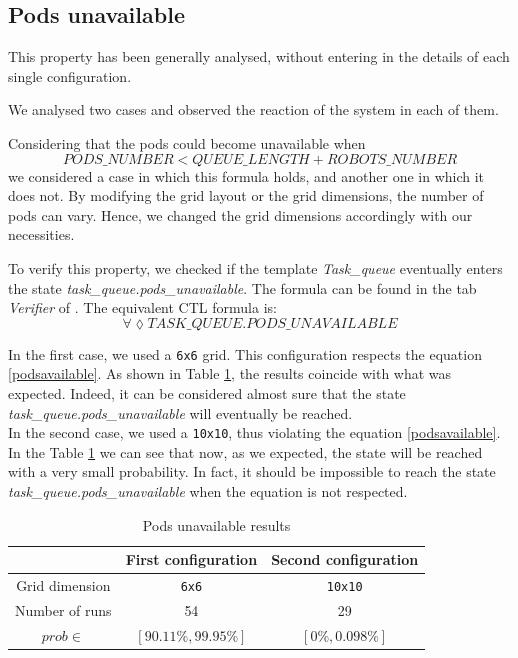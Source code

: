 \subsection{Pods unavailable} \label{podsunavailable}
This property has been generally analysed, without entering in the details of each single configuration.

We analysed two cases and observed the reaction of the system in each of them.

Considering that the pods could become unavailable when 
\begin{equation} \label{podsavailable}
    PODS\_NUMBER < QUEUE\_LENGTH + ROBOTS\_NUMBER
\end{equation}
we considered a case in which this formula holds, and another one in which it does not. By modifying the grid layout or the grid dimensions, the number of pods can vary. Hence, we changed the grid dimensions accordingly with our necessities.

To verify this property, we checked if the template \emph{Task\_queue} eventually enters the state \emph{task\_queue.pods\_unavailable}. The formula can be found in the tab \emph{Verifier} of \UPPAAL. The equivalent CTL formula is:
\begin{equation}
    \forall \lozenge TASK\_QUEUE.PODS\_UNAVAILABLE
\end{equation}

In the first case, we used a \texttt{6x6} grid. This configuration respects the equation \ref{podsavailable}. As shown in Table \ref{tab:tabpodsunavailable}, the results coincide with what was expected. Indeed, it can be considered almost sure that the state \emph{task\_queue.pods\_unavailable} will eventually be reached.
\\

In the second case, we used a \texttt{10x10}, thus violating the equation \ref{podsavailable}. In the Table \ref{tab:tabpodsunavailable} we can see that now, as we expected, the state will be reached with a very small probability. In fact, it should be impossible to reach the state \emph{task\_queue.pods\_unavailable} when the equation is not respected.

\begin{table}[h]
    \centering
        \begin{tabular}{| c || c c |} 
            \hline
             & First configuration & Second configuration \\ [0.5ex] 
            \hline\hline
            Grid dimension & \texttt{6x6} & \texttt{10x10} \\
            Number of runs & 54 & 29 \\
            \hline\hline
            $prob \in$ &  $[90.11\%,99.95\%]$ & $[0\%,0.098\%]$\\ [0.5ex] 
            \hline
        \end{tabular}
        \caption{Pods unavailable results}
        \label{tab:tabpodsunavailable}
    \end{table}

